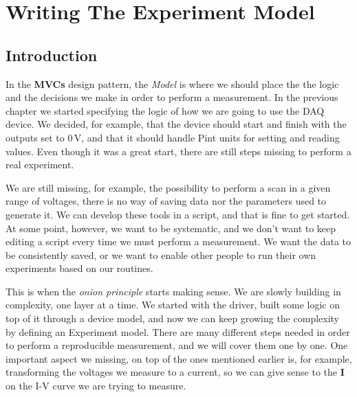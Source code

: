 \chapter{Writing The Experiment Model}\label{chapter:experiment-model}

\section{Introduction}
In the \textbf{MVCs} design pattern, the \emph{Model} is where we should place the the logic and the decisions we make in order to perform a measurement. In the previous chapter we started specifying the logic of how we are going to use the DAQ device. We decided, for example, that the device should start and finish with the outputs set to $0\,\textrm{V}$, and that it should handle Pint units for setting and reading values. Even though it was a great start, there are still steps missing to perform a real experiment.

We are still missing, for example, the possibility to perform a scan in a given range of voltages, there is no way of saving data nor the parameters used to generate it. We can develop these tools in a script, and that is fine to get started. At some point, however, we want to be systematic, and we don't want to keep editing a script every time we must perform a measurement. We want the data to be consistently saved, or we want to enable other people to run their own experiments based on our routines.

This is when the \emph{onion principle} starts making sense. We are slowly building in complexity, one layer at a time. We started with the driver, built some logic on top of it through a device model, and now we can keep growing the complexity by defining an Experiment model. There are many different steps needed in order to perform a reproducible measurement, and we will cover them one by one. One important aspect we missing, on top of the ones mentioned earlier is, for example, transforming the voltages we measure to a current, so we can give sense to the \textbf{I} on the I-V curve we are trying to measure.


